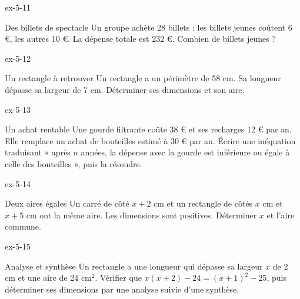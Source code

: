 \clearpage{}
\begin{blocLivre}{ex-5-11}\begin{exercice}[3]{Des billets de spectacle}
Un groupe achète 28 billets : les billets jeunes coûtent 6 €, les autres 10 €. La dépense totale est 232 €. Combien de billets jeunes ?
\end{exercice}\end{blocLivre}
\begin{blocLivre}{ex-5-12}\begin{exercice}[3]{Un rectangle à retrouver}
Un rectangle a un périmètre de 58 cm. Sa longueur dépasse sa largeur de 7 cm. Déterminer ses dimensions et son aire.
\label{fig-ex-5-12}
\end{exercice}\end{blocLivre}
\begin{blocLivre}{ex-5-13}\begin{exercice}[3]{Un achat rentable}
Une gourde filtrante coûte 38 € et ses recharges 12 € par an. Elle remplace un achat de bouteilles estimé à 30 € par an. Écrire une inéquation traduisant « après $n$ années, la dépense avec la gourde est inférieure ou égale à celle des bouteilles », puis la résoudre.
\end{exercice}\end{blocLivre}
\begin{blocLivre}{ex-5-14}\begin{exercice}[3]{Deux aires égales}
Un carré de côté $x+2$ cm et un rectangle de côtés $x$ cm et $x+5$ cm ont la même aire. Les dimensions sont positives. Déterminer $x$ et l’aire commune.
\label{fig-ex-5-14}
\end{exercice}\end{blocLivre}
\begin{blocLivre}{ex-5-15}\begin{exercice}[3]{Analyse et synthèse}
Un rectangle a une longueur qui dépasse sa largeur $x$ de 2 cm et une aire de 24 cm$^2$. Vérifier que $x(x+2)-24=(x+1)^2-25$, puis déterminer ses dimensions par une analyse suivie d’une synthèse.
\end{exercice}\end{blocLivre}

\clearpage
